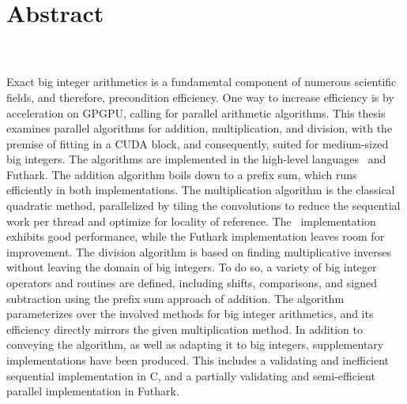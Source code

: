 \thispagestyle{empty}
{\centering
  \section*{Abstract}
}
\label{sec:abstract}
\hfill\\\\

Exact big integer arithmetics is a fundamental component of numerous scientific
fields, and therefore, precondition efficiency. One way to increase efficiency
is by acceleration on GPGPU, calling for parallel arithmetic algorithms. This
thesis examines parallel algorithms for addition, multiplication, and division,
with the premise of fitting in a CUDA block, and consequently, suited for
medium-sized big integers. The algorithms are implemented in the high-level
languages \cpp\ and Futhark. The addition algorithm boils down to a prefix sum,
which runs efficiently in both implementations. The multiplication algorithm is
the classical quadratic method, parallelized by tiling the convolutions to
reduce the sequential work per thread and optimize for locality of
reference. The \cpp\ implementation exhibits good performance, while the Futhark
implementation leaves room for improvement. The division algorithm is based on
finding multiplicative inverses without leaving the domain of big integers. To
do so, a variety of big integer operators and routines are defined, including
shifts, comparisons, and signed subtraction using the prefix sum approach of
addition. The algorithm parameterizes over the involved methods for big integer
arithmetics, and its efficiency directly mirrors the given multiplication
method. In addition to conveying the algorithm, as well as adapting it to big
integers, supplementary implementations have been produced. This includes a
validating and inefficient sequential implementation in C, and a partially
validating and semi-efficient parallel implementation in Futhark.

\restoregeometry

